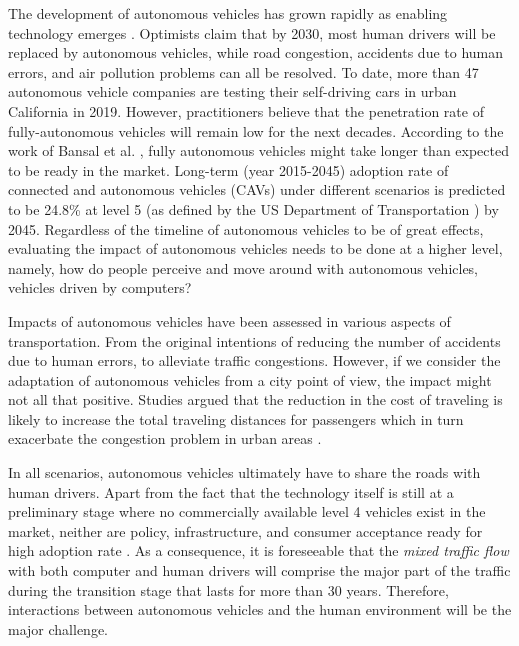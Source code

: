 


The development of autonomous vehicles has grown rapidly as enabling technology emerges \cite{thrun2006}. Optimists claim that by 2030, most human drivers will be replaced by autonomous vehicles, while road congestion, accidents due to human errors, and air pollution problems can all be resolved\cite{JW2016}. To date, more than 47 autonomous vehicle companies are testing their self-driving cars in urban California \cite{CADMV} in 2019. However, practitioners believe that the penetration rate of fully-autonomous vehicles will remain low for the next decades. According to the work of Bansal et al. \cite{Prateek2017}, fully autonomous vehicles might take longer than expected to be ready in the market. Long-term (year 2015-2045) adoption rate of connected and autonomous vehicles (CAVs) under different scenarios is predicted to be 24.8\% at level 5 (as defined by the US Department of Transportation \cite{AV_levels2019}) by 2045. Regardless of the timeline of autonomous vehicles to be of great effects, evaluating the impact of autonomous vehicles needs to be done at a higher level, namely, how do people perceive and move around with autonomous vehicles, vehicles driven by  computers? 


Impacts of autonomous vehicles have been assessed in various aspects of transportation. From the original intentions of reducing the number of accidents due to human errors, to alleviate traffic congestions\cite{Dresner2007, Ilgin2014}. However, if we consider the adaptation of autonomous vehicles from a city point of view, the impact might not all that positive. Studies argued that the reduction in the cost of traveling is likely to increase the total traveling distances for passengers which in turn exacerbate the congestion problem in urban areas\cite{EJTIR2017, MILLARDBALL2019} .


In all scenarios, autonomous vehicles ultimately have to share the roads with human drivers. Apart from the fact that the technology itself is still at a preliminary stage where no commercially available level 4 vehicles exist in the market, neither are policy, infrastructure, and consumer acceptance ready for high adoption rate \cite{litman2015}. As a consequence, it is foreseeable that the \textit{mixed traffic flow} with both computer and human drivers will comprise the major part of the traffic during the transition stage that lasts for more than 30 years. Therefore, interactions between autonomous vehicles and the human environment will be the major challenge.

